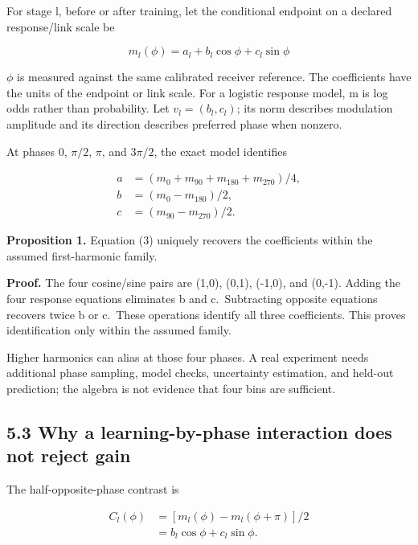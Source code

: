 \documentclass[
  american,
  11pt,
  letterpaper,
]{article}
\begin{document}
For stage l, before or after training, let the conditional endpoint on a declared response/link scale be

\begin{equation}
m_l(\phi)=a_l+b_l\cos\phi+c_l\sin\phi\tag{2}
\end{equation}

\(\phi\) is measured against the same calibrated receiver reference. The coefficients have the units of the endpoint or link scale. For a logistic response model, m is log odds rather than probability. Let \(v_l=(b_l,c_l)\); its norm describes modulation amplitude and its direction describes preferred phase when nonzero.

At phases 0, \(\pi/2\), \(\pi\), and \(3\pi/2\), the exact model identifies

\begin{equation}
\begin{aligned}a&=(m_0+m_{90}+m_{180}+m_{270})/4,\\ b&=(m_0-m_{180})/2,\\ c&=(m_{90}-m_{270})/2.\end{aligned}\tag{3}
\end{equation}

\textbf{Proposition 1.} Equation (3) uniquely recovers the coefficients within the assumed first-harmonic family.

\textbf{Proof.} The four cosine/sine pairs are (1,0), (0,1), (-1,0), and (0,-1). Adding the four response equations eliminates b and c.~Subtracting opposite equations recovers twice b or c.~These operations identify all three coefficients. This proves identification only within the assumed family.

Higher harmonics can alias at those four phases. A real experiment needs additional phase sampling, model checks, uncertainty estimation, and held-out prediction; the algebra is not evidence that four bins are sufficient.

\subsection{5.3 Why a learning-by-phase interaction does not reject gain}\label{why-a-learning-by-phase-interaction-does-not-reject-gain}

The half-opposite-phase contrast is

\begin{equation}
\begin{aligned}C_l(\phi)&=[m_l(\phi)-m_l(\phi+\pi)]/2\\ &=b_l\cos\phi+c_l\sin\phi.\end{aligned}\tag{4}
\end{equation}
\end{document}
